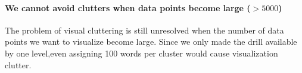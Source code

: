 \paragraph{\bf We cannot avoid clutters when data points become large ($>5000$)} 
The problem of visual cluttering is still unresolved when the number of data points we want to visualize become large. 
Since we only made the drill available by one level,even assigning 100 words per cluster would cause visualization clutter. 

